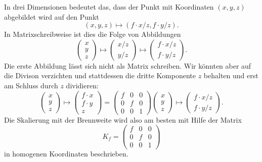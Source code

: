 In drei Dimensionen bedeutet das, dass der Punkt mit Koordinaten
$(x,y,z)$ abgebildet wird auf den Punkt
\[
(x,y,z) \mapsto (f\cdot x/z, f\cdot y/z).
\]
In Matrixschreibweise ist dies die Folge von Abbildungen
\[
\begin{pmatrix}
x\\y\\z
\end{pmatrix}
\mapsto
\begin{pmatrix}
x/z\\y/z
\end{pmatrix}
\mapsto
\begin{pmatrix}
f\cdot x/z\\f\cdot y/z
\end{pmatrix}.
\]
Die erste Abbildung lässt sich nicht als Matrix schreiben.
Wir könnten aber auf die Divison verzichten und stattdessen
die dritte Komponente $z$ behalten und erst am Schluss durch $z$
dividieren:
\[
\begin{pmatrix}
x\\y\\z
\end{pmatrix}
\mapsto
\begin{pmatrix}
f\cdot x\\f\cdot y\\z
\end{pmatrix}
=
\begin{pmatrix}
f&0&0\\
0&f&0\\
0&0&1
\end{pmatrix}
\begin{pmatrix}
x\\y\\z
\end{pmatrix}
\mapsto
\begin{pmatrix}
f\cdot x/z\\f\cdot y/z
\end{pmatrix}.
\]
Die Skalierung mit der Brennweite wird also am besten mit Hilfe der
Matrix
\[
K_f
=
\begin{pmatrix}f&0&0\\0&f&0\\0&0&1\end{pmatrix}
\]
in homogenen Koordinaten beschrieben.

